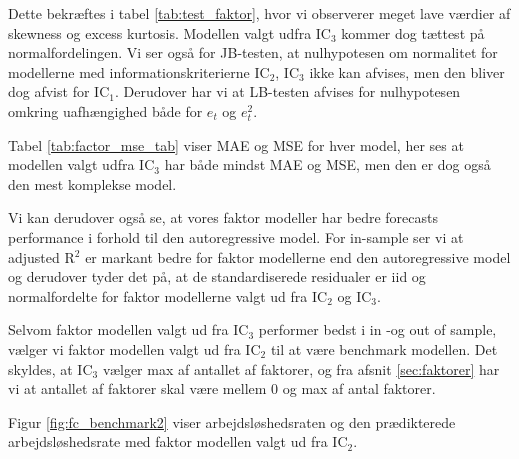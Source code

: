 Dette bekræftes i tabel \ref{tab:test_faktor}, hvor vi observerer meget lave værdier af skewness og excess kurtosis. 
Modellen valgt udfra IC$_3$ kommer dog tættest på normalfordelingen.
Vi ser også for JB-testen, at nulhypotesen om normalitet for modellerne med informationskriterierne IC$_2$, IC$_3$ ikke kan afvises, men den bliver dog afvist for IC$_1$.  Derudover har vi at LB-testen afvises for nulhypotesen omkring uafhængighed både for $e_t$ og $e_t^2$. 

Tabel \ref{tab:factor_mse_tab} viser MAE og MSE for hver model, her ses at modellen valgt udfra IC$_3$ har både mindst MAE og MSE, men den er dog også den mest komplekse model. 



Vi kan derudover også se, at vores faktor modeller har bedre forecasts performance i forhold til den autoregressive model. 
For in-sample ser vi at adjusted R$^2$ er markant bedre for faktor modellerne end den autoregressive model og derudover tyder det på, at de standardiserede residualer er iid og normalfordelte for faktor modellerne valgt ud fra IC$_2$ og IC$_3$. 

Selvom faktor modellen valgt ud fra IC$_3$ performer bedst i in -og out of sample, vælger vi faktor modellen valgt ud fra IC$_2$ til at være benchmark modellen. 
Det skyldes, at IC$_3$ vælger max af antallet af faktorer, og fra afsnit \ref{sec:faktorer} har vi at antallet af faktorer skal være mellem 0 og max af antal faktorer. 

Figur \ref{fig:fc_benchmark2} viser arbejdsløshedsraten og den prædikterede arbejdsløshedsrate med faktor modellen valgt ud fra IC\(_2\).




%
%
%
%






